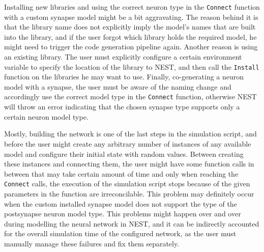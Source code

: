   Installing new libraries and using the correct neuron type in the \texttt{Connect} function with a custom synapse model might be a bit aggravating. The reason behind it is that the library name does not explicitly imply the model's names that are built into the library, and if the user forgot which library holds the required model, he might need to trigger the code generation pipeline again. Another reason is using an existing library. The user must explicitly configure a certain environment variable to specify the location of the library to NEST, and then call the \texttt{Install} function on the libraries he may want to use. Finally,  co-generating a neuron model with a synapse, the user must be aware of the naming change and accordingly use the correct model type in the \texttt{Connect} function, otherwise NEST will throw an error indicating that the chosen synapse type supports only a certain neuron model type.
  
  Mostly, building the network is one of the last steps in the simulation script, and before the user might create any arbitrary number of instances of any available model and configure their initial state with random values. Between creating these instances and connecting them, the user might have some function calls in between that may take certain amount of time and only when reaching the \texttt{Connect} calls, the execution of the simulation script stops because of the given parameters in the function are irreconcilable. This problem may definitely occur when the custom installed synapse model does not support the type of the postsynapse neuron model type.  This problems might happen over and over during modelling the neural network in NEST, and it can be indirectly accounted for the overall simulation time of the configured network, as the user must manually manage these failures and fix them separately.

